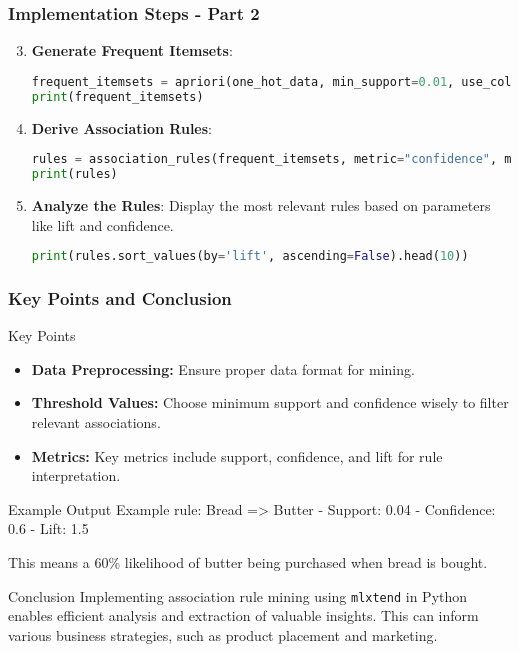 \documentclass[aspectratio=169]{beamer}
\begin{document}
\begin{frame}[fragile]
    \frametitle{Implementation Steps - Part 2}
    
    \begin{enumerate}
        \setcounter{enumi}{2}
        \item \textbf{Generate Frequent Itemsets}:
        \begin{lstlisting}[language=Python]
frequent_itemsets = apriori(one_hot_data, min_support=0.01, use_colnames=True)
print(frequent_itemsets)
        \end{lstlisting}
        
        \item \textbf{Derive Association Rules}:
        \begin{lstlisting}[language=Python]
rules = association_rules(frequent_itemsets, metric="confidence", min_threshold=0.5)
print(rules)
        \end{lstlisting}
        
        \item \textbf{Analyze the Rules}:
        Display the most relevant rules based on parameters like lift and confidence.
        \begin{lstlisting}[language=Python]
print(rules.sort_values(by='lift', ascending=False).head(10))
        \end{lstlisting}
    \end{enumerate}
\end{frame}

\begin{frame}
    \frametitle{Key Points and Conclusion}
    
    \begin{block}{Key Points}
        \begin{itemize}
            \item \textbf{Data Preprocessing:} Ensure proper data format for mining.
            \item \textbf{Threshold Values:} Choose minimum support and confidence wisely to filter relevant associations.
            \item \textbf{Metrics:} Key metrics include support, confidence, and lift for rule interpretation.
        \end{itemize}
    \end{block}

    \begin{block}{Example Output}
        Example rule: {Bread} => {Butter}
        - Support: 0.04
        - Confidence: 0.6
        - Lift: 1.5
        
        This means a 60\% likelihood of butter being purchased when bread is bought.
    \end{block}
    
    \begin{block}{Conclusion}
        Implementing association rule mining using \texttt{mlxtend} in Python enables efficient analysis and extraction of valuable insights. 
        This can inform various business strategies, such as product placement and marketing.
    \end{block}
\end{frame}
\end{document}
